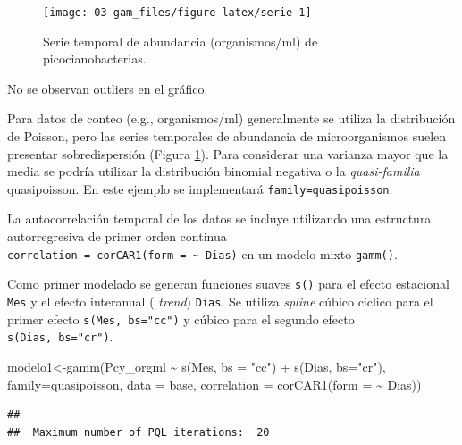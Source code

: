 \documentclass[
]{book}
\newenvironment{Shaded}{\begin{snugshade}}{\end{snugshade}}
\newcommand{\AttributeTok}[1]{\textcolor[rgb]{0.77,0.63,0.00}{#1}}
\newcommand{\FunctionTok}[1]{\textcolor[rgb]{0.00,0.00,0.00}{#1}}
\newcommand{\NormalTok}[1]{#1}
\newcommand{\OtherTok}[1]{\textcolor[rgb]{0.56,0.35,0.01}{#1}}
\newcommand{\SpecialCharTok}[1]{\textcolor[rgb]{0.00,0.00,0.00}{#1}}
\newcommand{\StringTok}[1]{\textcolor[rgb]{0.31,0.60,0.02}{#1}}
\begin{document}
\begin{figure}

{\centering \texttt{[image: 03-gam\_files/figure-latex/serie-1]} 

}

\caption{Serie temporal de abundancia (organismos/ml) de picocianobacterias.}\label{fig:serie}
\end{figure}

No se observan outliers en el gráfico.

Para datos de conteo (e.g., organismos/ml) generalmente se utiliza la distribución de Poisson, pero las series temporales de abundancia de microorganismos suelen presentar sobredispersión (Figura \ref{fig:serie}). Para considerar una varianza mayor que la media se podría utilizar la distribución binomial negativa o la \emph{quasi-familia} quasipoisson. En este ejemplo se implementará \texttt{family=quasipoisson}.

La autocorrelación temporal de los datos se incluye utilizando una estructura autorregresiva de primer orden continua \texttt{correlation\ =\ corCAR1(form\ =\ \textasciitilde{}\ Dias)} en un modelo mixto \texttt{gamm()}.

Como primer modelado se generan funciones suaves \texttt{s()} para el efecto estacional \texttt{Mes} y el efecto interanual ( \emph{trend}) \texttt{Dias}. Se utiliza \emph{spline} cúbico cíclico para el primer efecto \texttt{s(Mes,\ bs="cc")} y cúbico para el segundo efecto \texttt{s(Dias,\ bs="cr")}.

\begin{Shaded}
\begin{Highlighting}[]
\NormalTok{modelo1}\OtherTok{\textless{}{-}}\FunctionTok{gamm}\NormalTok{(Pcy\_orgml }\SpecialCharTok{\textasciitilde{}} \FunctionTok{s}\NormalTok{(Mes, }\AttributeTok{bs =} \StringTok{"cc"}\NormalTok{) }\SpecialCharTok{+} \FunctionTok{s}\NormalTok{(Dias, }\AttributeTok{bs=}\StringTok{"cr"}\NormalTok{), }
              \AttributeTok{family=}\NormalTok{quasipoisson, }\AttributeTok{data =}\NormalTok{ base, }
              \AttributeTok{correlation =} \FunctionTok{corCAR1}\NormalTok{(}\AttributeTok{form =} \SpecialCharTok{\textasciitilde{}}\NormalTok{ Dias))}
\end{Highlighting}
\end{Shaded}

\begin{verbatim}
## 
##  Maximum number of PQL iterations:  20
\end{verbatim}
\end{document}
